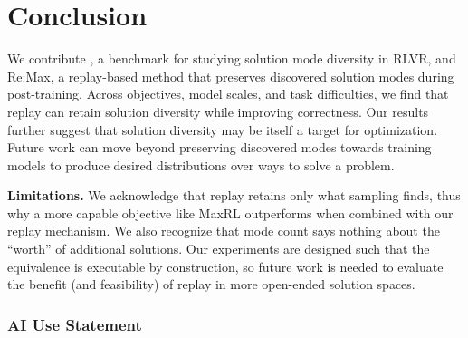 

\section{Conclusion}
\label{sec:conclusion}
\label{sec:discussion}
\label{sec:limitations}



We contribute \mb{}, a benchmark for studying solution mode diversity in RLVR, and Re:Max, a replay-based method that preserves discovered solution modes during post-training. 
Across objectives, model scales, and task difficulties, we find that replay can retain solution diversity while improving correctness. 
Our results further suggest that solution diversity may be itself a target for optimization. Future work can move beyond preserving discovered modes towards training models to produce desired distributions over ways to solve a problem.




\textbf{Limitations.} We acknowledge that replay retains only what sampling finds, thus why a more capable objective like MaxRL outperforms when combined with our replay mechanism. We also recognize that mode count says nothing about the ``worth'' of additional solutions. Our experiments are designed such that the equivalence is executable by construction, so future work is needed to evaluate the benefit (and feasibility) of replay in more open-ended solution spaces. 

\label{sec:main-end}
\clearpage
\subsubsection*{AI Use Statement}
\label{sec:ai-use}

